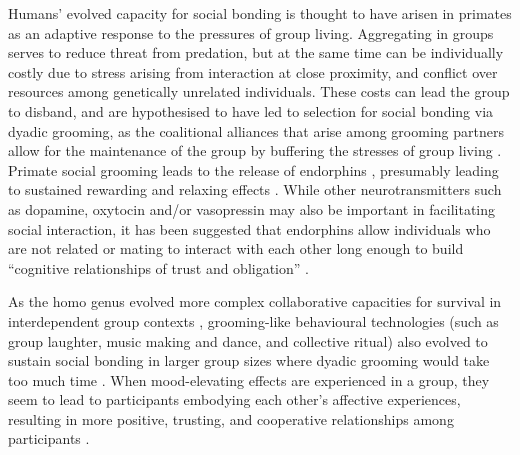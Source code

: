 \begin{CJK}{UTF8}{gbsn}

Humans' evolved capacity for social bonding is thought to have arisen in primates as an adaptive response to the pressures of group living.  Aggregating in groups serves to reduce threat from predation, but at the same time can be individually costly due to stress arising from interaction at close proximity, and conflict over resources among genetically unrelated individuals.  These costs can lead the group to disband, and are hypothesised to have led to selection for social bonding via dyadic grooming, as the coalitional alliances that arise among grooming partners allow for the maintenance of the group by buffering the stresses of group living \citep{Dunbar2012}.  Primate social grooming leads to the release of endorphins \citep[a type of endogenous opioid, see][]{Keverne1989}, presumably leading to sustained rewarding and relaxing effects \citep{Dunbar2010}.  While other neurotransmitters such as dopamine, oxytocin and/or vasopressin may also be important in facilitating social interaction, it has been suggested that endorphins allow individuals who are not related or mating to interact with each other long enough to build ``cognitive relationships of trust and obligation'' \citep[1839]{Dunbar2012}.

As the homo genus evolved more complex collaborative capacities for survival in interdependent group contexts \citep[see][]{Dunbar1998,Tomasello2012a}, grooming-like behavioural technologies (such as group laughter, music making and dance, and collective ritual) also evolved \citep[via processes of multi-level cultural group selection, see][]{Wilson2008} to sustain social bonding in larger group sizes where dyadic grooming would take too much time \citep{Dunbar2012,Tarr2014,Launay2016}.
When mood-elevating effects are experienced in a group, they seem to lead to participants embodying each other's affective experiences, resulting in more positive, trusting, and cooperative relationships among participants \citep{Dunbar2012}.



\end{CJK}
